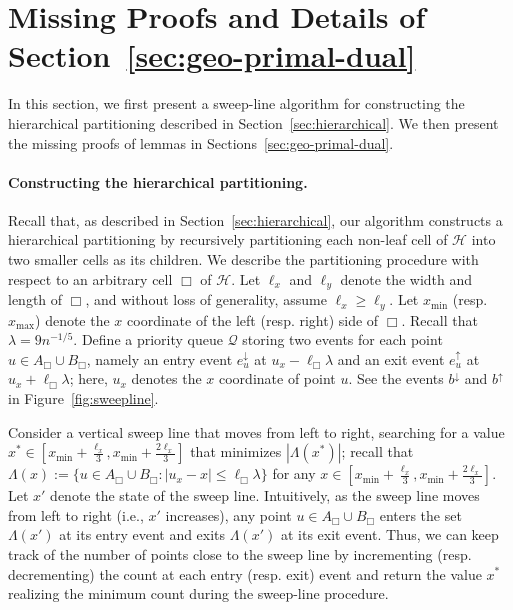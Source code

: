 \documentclass[11pt,onecolumn]{article}
\def\mcH{{\mathcal{H}}}
\def\mcQ{{\mathcal{Q}}}
\newcommand{\cell}{\Box}
\newcommand\myparagraph[1]{\paragraph{#1}}
\begin{document}
\section{Missing Proofs and Details of Section~\ref{sec:geo-primal-dual}}\label{sec:appendix-geo-primal-dual}
In this section, we first present a sweep-line algorithm for constructing the hierarchical partitioning described in Section~\ref{sec:hierarchical}. We then present the missing proofs of lemmas in Sections~\ref{sec:geo-primal-dual}.


\myparagraph{Constructing the hierarchical partitioning.} Recall that, as described in Section~\ref{sec:hierarchical}, our algorithm constructs a hierarchical partitioning by recursively partitioning each non-leaf cell of $\mcH$ into two smaller cells as its children. We describe the partitioning procedure with respect to an arbitrary cell $\cell$ of $\mcH$. Let $\ell_x$ and $\ell_y$ denote the width and length of $\cell$, and without loss of generality, assume $\ell_x\ge \ell_y$. Let $x_{\min}$ (resp. $x_{\max}$) denote the $x$ coordinate of the left (resp. right) side of $\cell$. Recall that $\lambda=9n^{-1/5}$. Define a priority queue $\mcQ$ storing two events for each point $u\in A_\cell\cup B_\cell$, namely an entry event $e_u^\downarrow$ at $u_x-\ell_\cell\lambda$ and an exit event $e_u^\uparrow$ at $u_x + \ell_\cell\lambda$; here, $u_x$ denotes the $x$ coordinate of point $u$. See the events $b^\downarrow$ and $b^\uparrow$ in Figure~\ref{fig:sweepline}.

Consider a vertical sweep line that moves from left to right, searching for a value $x^* \in [x_{\min} + \frac{\ell_x}{3}, x_{\min} + \frac{2\ell_x}{3}]$ that minimizes $|\Lambda(x^*)|$; recall that $\Lambda(x):=\{u\in A_\cell\cup B_\cell: |u_x-x|\le \ell_\cell\lambda\}$ for any $x\in [x_{\min} + \frac{\ell_x}{3}, x_{\min} + \frac{2\ell_x}{3}]$. Let $x'$ denote the state of the sweep line. Intuitively, as the sweep line moves from left to right (i.e., $x'$ increases), any point $u\in A_\cell\cup B_\cell$ enters the set $\Lambda(x')$ at its entry event and exits $\Lambda(x')$ at its exit event. Thus, we can keep track of the number of points close to the sweep line by incrementing (resp. decrementing) the count at each entry (resp. exit) event and return the value $x^*$ realizing the minimum count during the sweep-line procedure. 
\end{document}

